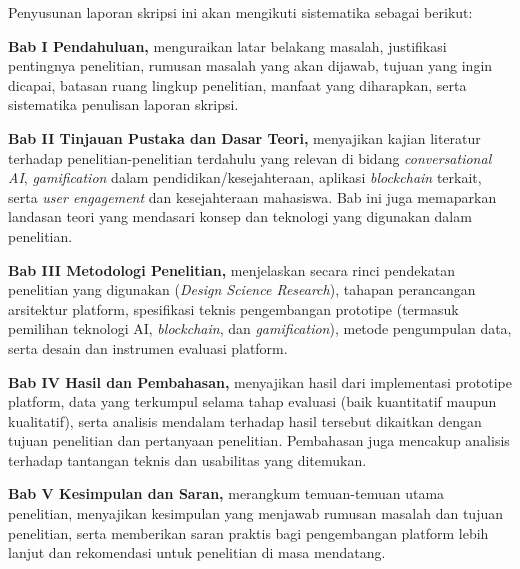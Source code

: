 Penyusunan laporan skripsi ini akan mengikuti sistematika sebagai berikut:

\textbf{Bab I Pendahuluan,} menguraikan latar belakang masalah, justifikasi pentingnya penelitian, rumusan masalah yang akan dijawab, tujuan yang ingin dicapai, batasan ruang lingkup penelitian, manfaat yang diharapkan, serta sistematika penulisan laporan skripsi.

\textbf{Bab II Tinjauan Pustaka dan Dasar Teori,} menyajikan kajian literatur terhadap penelitian-penelitian terdahulu yang relevan di bidang \textit{conversational AI}, \textit{gamification} dalam pendidikan/kesejahteraan, aplikasi \textit{blockchain} terkait, serta \textit{user engagement} dan kesejahteraan mahasiswa. Bab ini juga memaparkan landasan teori yang mendasari konsep dan teknologi yang digunakan dalam penelitian.

\textbf{Bab III Metodologi Penelitian,} menjelaskan secara rinci pendekatan penelitian yang digunakan (\textit{Design Science Research}), tahapan perancangan arsitektur platform, spesifikasi teknis pengembangan prototipe (termasuk pemilihan teknologi AI, \textit{blockchain}, dan \textit{gamification}), metode pengumpulan data, serta desain dan instrumen evaluasi platform.

\textbf{Bab IV Hasil dan Pembahasan,} menyajikan hasil dari implementasi prototipe platform, data yang terkumpul selama tahap evaluasi (baik kuantitatif maupun kualitatif), serta analisis mendalam terhadap hasil tersebut dikaitkan dengan tujuan penelitian dan pertanyaan penelitian. Pembahasan juga mencakup analisis terhadap tantangan teknis dan usabilitas yang ditemukan.

\textbf{Bab V Kesimpulan dan Saran,} merangkum temuan-temuan utama penelitian, menyajikan kesimpulan yang menjawab rumusan masalah dan tujuan penelitian, serta memberikan saran praktis bagi pengembangan platform lebih lanjut dan rekomendasi untuk penelitian di masa mendatang.

